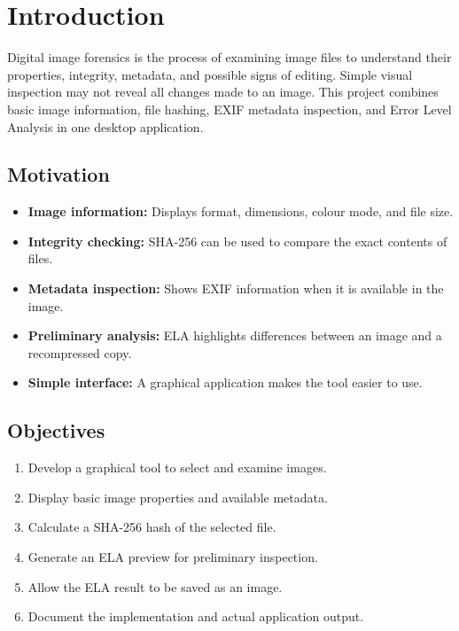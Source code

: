 \documentclass[12pt,a4paper]{report}
\begin{document}
\tableofcontents
\listoffigures
\listoftables

\chapter{Introduction}
Digital image forensics is the process of examining image files to understand their properties, integrity, metadata, and possible signs of editing. Simple visual inspection may not reveal all changes made to an image.
This project combines basic image information, file hashing, EXIF metadata inspection, and Error Level Analysis in one desktop application.

\section{Motivation}
\begin{itemize}
    \item \textbf{Image information:} Displays format, dimensions, colour mode, and file size.
    \item \textbf{Integrity checking:} SHA-256 can be used to compare the exact contents of files.
    \item \textbf{Metadata inspection:} Shows EXIF information when it is available in the image.
    \item \textbf{Preliminary analysis:} ELA highlights differences between an image and a recompressed copy.
    \item \textbf{Simple interface:} A graphical application makes the tool easier to use.
\end{itemize}

\section{Objectives}
\begin{enumerate}
    \item Develop a graphical tool to select and examine images.
    \item Display basic image properties and available metadata.
    \item Calculate a SHA-256 hash of the selected file.
    \item Generate an ELA preview for preliminary inspection.
    \item Allow the ELA result to be saved as an image.
    \item Document the implementation and actual application output.
\end{enumerate}
\end{document}
